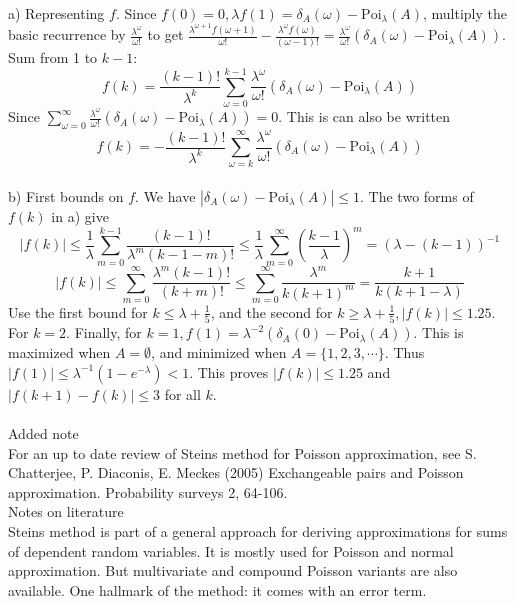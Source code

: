 \documentclass[12pt]{article}
\begin{document}
\\
a) Representing $f$. Since $f(0) = 0, \lambda f(1) = \delta_A(\omega) - \text{Poi}_{\lambda}(A)$, multiply the basic recurrence by $\frac{\lambda^{\omega}}{\omega!}$ to get $\frac{\lambda^{\omega + 1}f(\omega + 1)}{\omega!} - \frac{\lambda^{\omega}f(\omega)}{(\omega - 1)!} = \frac{\lambda^{\omega}}{\omega!}(\delta_A(\omega) - \text{Poi}_{\lambda}(A))$. Sum from 1 to $k - 1$:
	$$f(k) = \frac{(k - 1)!}{\lambda^k}\sum_{\omega = 0}^{k - 1}\frac{\lambda^{\omega}}{\omega!}(\delta_A(\omega) - \text{Poi}_{\lambda}(A))$$
	Since $\sum_{\omega = 0}^{\infty}\frac{\lambda^{\omega}}{\omega!}(\delta_A(\omega) - \text{Poi}_{\lambda}(A)) = 0$. This is can also be written
	$$f(k) = -\frac{(k - 1)!}{\lambda^k}\sum_{\omega = k}^{\infty}\frac{\lambda^{\omega}}{\omega!}(\delta_A(\omega) - \text{Poi}_{\lambda}(A))$$
\\
b) First bounds on $f$. We have $|\delta_A(\omega) - \text{Poi}_{\lambda}(A)| \leqslant 1$. The two forms of $f(k)$ in a) give
$$|f(k)| \leqslant \frac{1}{\lambda}\sum_{m = 0}^{k - 1}\frac{(k - 1)!}{\lambda^m(k - 1 - m)!} \leqslant \frac{1}{\lambda}\sum_{m = 0}^{\infty} (\frac{k - 1}{\lambda})^m = (\lambda - (k - 1))^{-1}$$
$$|f(k)| \leqslant \sum_{m = 0}^{\infty} \frac{\lambda^m (k - 1)!}{(k + m)!} \leqslant \sum_{m = 0}^{\infty}\frac{\lambda^m}{k(k + 1)^m} = \frac{k + 1}{k(k + 1 - \lambda)}$$
Use the first bound for $k \leqslant \lambda + \frac{1}{5}$, and the second for $k \geqslant \lambda + \frac{1}{5}, |f(k)| \leqslant 1.25$. For $k = 2$. Finally, for $k = 1, f(1) = \lambda^{-2}(\delta_A(0) - \text{Poi}_{\lambda}(A))$. This is maximized when $A = \emptyset$, and minimized when $A = \{1, 2, 3, \cdots\}$. Thus $|f(1)| \leqslant \lambda^{-1}(1 - e^{-\lambda}) < 1$. This proves $|f(k)| \leqslant 1.25$ and $|f(k + 1) - f(k)| \leqslant 3$ for all $k$.\\
\\
Added note\\
For an up to date review of Steins method for Poisson approximation, see S. Chatterjee, P. Diaconis, E. Meckes (2005) Exchangeable pairs and Poisson approximation. Probability surveys 2, 64-106.\\
Notes on literature\\
Steins method is part of a general approach for deriving approximations for sums of dependent random variables. It is mostly used for Poisson and normal approximation. But multivariate and compound Poisson variants are also available. One hallmark of the method: it comes with an error term.\\
\end{document}
